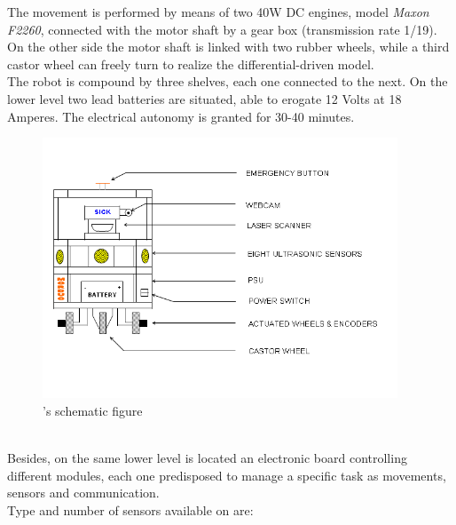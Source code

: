The movement is performed by means of two 40W DC engines, model
\textit{Maxon F2260}, connected with the motor shaft by a gear
box (transmission rate 1/19). On the other side the motor shaft
is linked with two rubber wheels, while a third castor wheel can
freely turn to realize the differential-driven model.
\\
The robot is compound by three shelves, each one connected to
the next. On the lower level two lead batteries are situated,
able to erogate 12 Volts at 18 Amperes. The electrical autonomy is
granted for 30-40 minutes.
\begin{figure}[h]
  \begin{center}
    \includegraphics[width=300pt]{img/Morduc_scheme.png}
    \caption{\morduc{}'s schematic figure}
    \label{fig:morduc_scheme}
  \end{center}
\end{figure}
\\
Besides, on the same lower level is located an electronic board
controlling different modules, each one predisposed to manage a
specific task as movements, sensors and communication.
\\
Type and number of sensors available on \morduc{} are:

